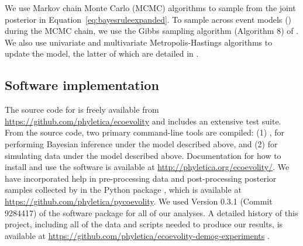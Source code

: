 We use Markov chain Monte Carlo (MCMC) algorithms to sample from the joint
posterior in Equation~\ref{eq:bayesruleexpanded}.
To sample across event models (\etimesets) during the MCMC chain, we use the
Gibbs sampling algorithm (Algorithm 8) of \citet{Neal2000}.
We also use univariate and multivariate Metropolis-Hastings algorithms
\citep{Metropolis1953,Hastings1970} to update the model,
the latter of which are detailed in \citet{Oaks2018ecoevolity}.

\subsection{Software implementation}
The \cpp source code for \ecoevolity is freely available from
\url{https://github.com/phyletica/ecoevolity} and includes an extensive test
suite.
From the \cpp source code, two primary command-line tools are compiled:
(1) \ecoevolity, for performing Bayesian inference under the model described
above,
and
(2) \simcoevolity for simulating data under the model described above.
Documentation for how to install and use the software is available at
\url{http://phyletica.org/ecoevolity/}.
We have incorporated help in pre-processing data and post-processing posterior
samples collected by \ecoevolity in the Python package \pycoevolity, which is
available at
\url{https://github.com/phyletica/pycoevolity}.
We used Version 0.3.1
(Commit 9284417)
of the \ecoevolity software package for all of our analyses.
A detailed history of this project, including all of the data and scripts
needed to produce our results, is available at
\url{https://github.com/phyletica/ecoevolity-demog-experiments}
\citep{Oaks2019CodemogZenodo}.
